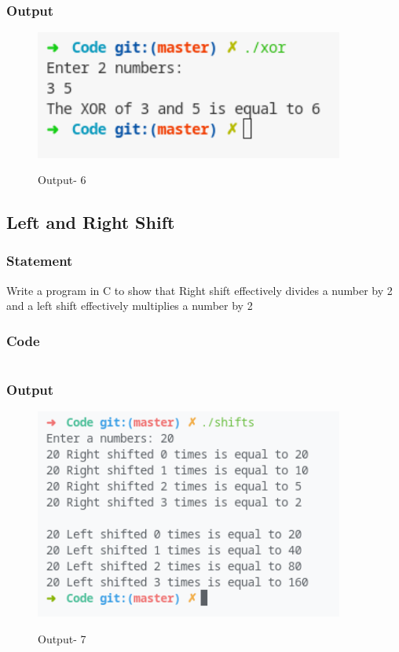 \subsubsection{Output}
\begin{figure}[!htb]
  \centering
  \includegraphics[width=4in]{Images/xor.png}
  \label{Output-6}
  \caption{Output- 6}
\end{figure}


\pagebreak
\subsection{Left and Right Shift}

\subsubsection{Statement}
Write a program in C to show that Right shift effectively divides a number by 2 and a left shift
effectively multiplies a number by 2

\subsubsection{Code}
\inputminted[]{c}{../Code/shifts.cpp}
\subsubsection{Output}
\begin{figure}[!htb]
  \centering
  \includegraphics[width=4in]{Images/shifts.png}
  \label{Output-7}
  \caption{Output- 7}
\end{figure}


